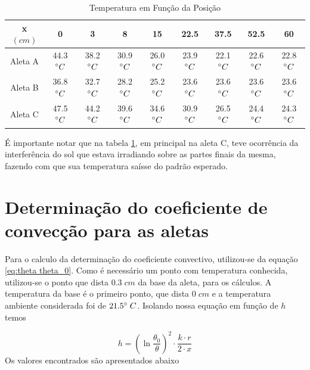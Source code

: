\documentclass[12pt,openright,twoside,a4paper]{abntex2}
\begin{document}
\begin{table}[H]
	\centering
	\caption{Temperatura em Função da Posição}
	\begin{adjustbox}{width=0.95\textwidth,center=\textwidth}
		\begin{tabular}{c|c|c|c|c|c|c|c|c}
			\toprule
			x \((cm)\) & 0                   & 3                   & 8                   & 15                 & 22.5                & 37.5                & 52.5                & 60                  \\
			\midrule
			Aleta A    & 44.3 \(\degree C\)  & 38.2 \(\degree C\)  & 30.9 \(\degree C\)  & 26.0 \(\degree C\) & 23.9 \(\degree C\)  & 22.1 \(\degree  C\) & 22.6 \(\degree  C\) & 22.8 \(\degree  C\) \\
			Aleta B    & 36.8 \(\degree C\)  & 32.7 \(\degree C\)  & 28.2 \(\degree C\)  & 25.2 \(\degree C\) & 23.6 \(\degree C\)  & 23.6 \(\degree  C\) & 23.6 \(\degree  C\) & 23.6 \(\degree  C\) \\
			Aleta C    & 47.5 \(\degree  C\) & 44.2 \(\degree  C\) & 39.6 \(\degree  C\) & 34.6 \(\degree C\) & 30.9 \(\degree  C\) & 26.5 \(\degree C\)  & 24.4 \(\degree C\)  & 24.3 \(\degree C\)  \\
			\bottomrule
		\end{tabular}
	\end{adjustbox}
	\label{tab:temp_posicao}
\end{table}

É importante notar que na tabela \ref{tab:temp_posicao}, em principal na aleta C, teve ocorrência da interferência do sol que estava irradiando sobre as partes finais da mesma, fazendo com que sua temperatura saísse do padrão esperado.

\section{Determinação do coeficiente de convecção para as aletas} %
\label{sec:determinacao_h}
Para o calculo da determinação do coeficiente convectivo, utilizou-se da equação \eqref{eq:theta theta_0}. Como é necessário um ponto com temperatura conhecida, utilizou-se o ponto que dista \(0.3 \; cm\) da base da aleta, para os cálculos. A temperatura da base é o primeiro ponto, que dista  \(0 \; cm\) e a temperatura ambiente considerada foi de  \(21.5 \degree \; C\). Isolando nossa equação em função de  \(h\) temos

\begin{equation}
	h = \left( \ln \frac{\theta_0}{\theta} \right)^2 \cdot \frac{k \cdot r}{2 \cdot x}
\end{equation}
Os valores encontrados são apresentados abaixo
\end{document}
